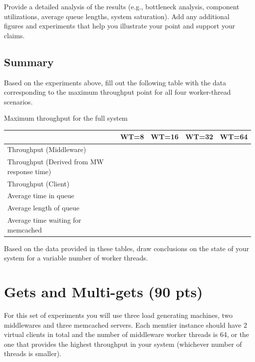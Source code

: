 \documentclass[11pt,a4paper]{article}
\begin{document}
Provide a detailed analysis of the results (e.g., bottleneck analysis, component utilizations, average queue lengths, system saturation). Add any additional figures and experiments that help you illustrate your point and support your claims.

\subsection{Summary}

Based on the experiments above, fill out the following table with the data corresponding to the maximum throughput point for all four worker-thread scenarios.

\begin{center}
	{Maximum throughput for the full system}
	\begin{tabular}{|l|p{1.5cm}|p{1.5cm}|p{1.5cm}|p{1.5cm}|}
		\hline                                            & WT=8 & WT=16 & WT=32 & WT=64 \\ 
		\hline Throughput (Middleware)                    &      &       &       &       \\ 
		\hline Throughput (Derived from MW response time) &      &       &       &       \\ 
		\hline Throughput (Client)                        &      &       &       &       \\ 
		\hline Average time in queue                      &      &       &       &       \\ 
		\hline Average length of queue                    &      &       &       &       \\ 
		\hline Average time waiting for memcached         &      &       &       &       \\ 
		\hline 
	\end{tabular}
\end{center}

Based on the data provided in these tables, draw conclusions on the state of your system for a variable number of worker threads.

\section{Gets and Multi-gets (90 pts)}

For this set of experiments you will use three load generating machines, two middlewares and three memcached servers. Each memtier instance should have 2 virtual clients in total and the number of middleware worker threads is 64, or the one that provides the highest throughput in your system (whichever number of threads is smaller).
\end{document}

